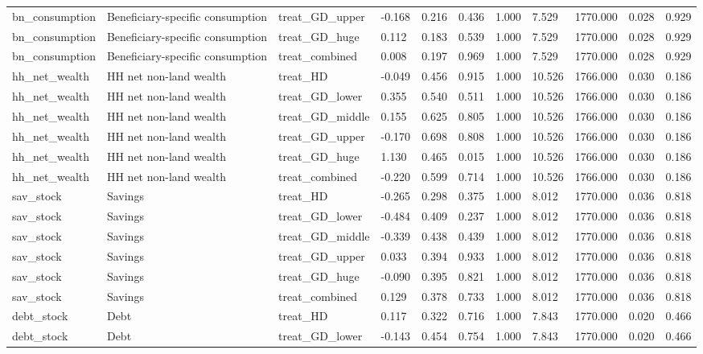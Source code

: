 \begin{tabular}{lllllllllll}
bn\_consumption & Beneficiary-specific consumption & treat\_GD\_upper & -0.168 & 0.216 & 0.436 & 1.000 & 7.529 & 1770.000 & 0.028 & 0.929 \\
bn\_consumption & Beneficiary-specific consumption & treat\_GD\_huge & 0.112 & 0.183 & 0.539 & 1.000 & 7.529 & 1770.000 & 0.028 & 0.929 \\
bn\_consumption & Beneficiary-specific consumption & treat\_combined & 0.008 & 0.197 & 0.969 & 1.000 & 7.529 & 1770.000 & 0.028 & 0.929 \\
hh\_net\_wealth & HH net non-land wealth & treat\_HD & -0.049 & 0.456 & 0.915 & 1.000 & 10.526 & 1766.000 & 0.030 & 0.186 \\
hh\_net\_wealth & HH net non-land wealth & treat\_GD\_lower & 0.355 & 0.540 & 0.511 & 1.000 & 10.526 & 1766.000 & 0.030 & 0.186 \\
hh\_net\_wealth & HH net non-land wealth & treat\_GD\_middle & 0.155 & 0.625 & 0.805 & 1.000 & 10.526 & 1766.000 & 0.030 & 0.186 \\
hh\_net\_wealth & HH net non-land wealth & treat\_GD\_upper & -0.170 & 0.698 & 0.808 & 1.000 & 10.526 & 1766.000 & 0.030 & 0.186 \\
hh\_net\_wealth & HH net non-land wealth & treat\_GD\_huge & 1.130 & 0.465 & 0.015 & 1.000 & 10.526 & 1766.000 & 0.030 & 0.186 \\
hh\_net\_wealth & HH net non-land wealth & treat\_combined & -0.220 & 0.599 & 0.714 & 1.000 & 10.526 & 1766.000 & 0.030 & 0.186 \\
sav\_stock & Savings & treat\_HD & -0.265 & 0.298 & 0.375 & 1.000 & 8.012 & 1770.000 & 0.036 & 0.818 \\
sav\_stock & Savings & treat\_GD\_lower & -0.484 & 0.409 & 0.237 & 1.000 & 8.012 & 1770.000 & 0.036 & 0.818 \\
sav\_stock & Savings & treat\_GD\_middle & -0.339 & 0.438 & 0.439 & 1.000 & 8.012 & 1770.000 & 0.036 & 0.818 \\
sav\_stock & Savings & treat\_GD\_upper & 0.033 & 0.394 & 0.933 & 1.000 & 8.012 & 1770.000 & 0.036 & 0.818 \\
sav\_stock & Savings & treat\_GD\_huge & -0.090 & 0.395 & 0.821 & 1.000 & 8.012 & 1770.000 & 0.036 & 0.818 \\
sav\_stock & Savings & treat\_combined & 0.129 & 0.378 & 0.733 & 1.000 & 8.012 & 1770.000 & 0.036 & 0.818 \\
debt\_stock & Debt & treat\_HD & 0.117 & 0.322 & 0.716 & 1.000 & 7.843 & 1770.000 & 0.020 & 0.466 \\
debt\_stock & Debt & treat\_GD\_lower & -0.143 & 0.454 & 0.754 & 1.000 & 7.843 & 1770.000 & 0.020 & 0.466 \\

\end{tabular}
